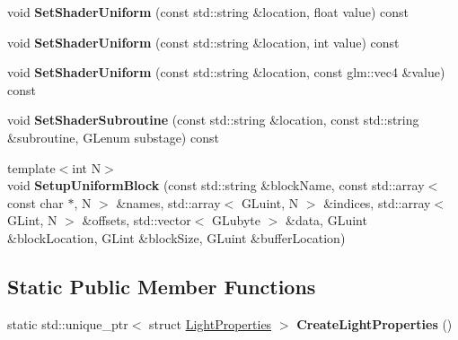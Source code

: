 \begin{DoxyCompactItemize}
\item 
\hypertarget{class_shader_program_a3a4c9cd6967787bded962acd7ce6b3c6}{}void {\bfseries Set\+Shader\+Uniform} (const std\+::string \&location, float value) const \label{class_shader_program_a3a4c9cd6967787bded962acd7ce6b3c6}

\item 
\hypertarget{class_shader_program_a93e7090cc8ff284bfcde6ae972aa5b9e}{}void {\bfseries Set\+Shader\+Uniform} (const std\+::string \&location, int value) const \label{class_shader_program_a93e7090cc8ff284bfcde6ae972aa5b9e}

\item 
\hypertarget{class_shader_program_a08b8936758c067aad38e6cd94608663f}{}void {\bfseries Set\+Shader\+Uniform} (const std\+::string \&location, const glm\+::vec4 \&value) const \label{class_shader_program_a08b8936758c067aad38e6cd94608663f}

\item 
\hypertarget{class_shader_program_ae2e00fa2f9107b34c758996021574b15}{}void {\bfseries Set\+Shader\+Subroutine} (const std\+::string \&location, const std\+::string \&subroutine, G\+Lenum substage) const \label{class_shader_program_ae2e00fa2f9107b34c758996021574b15}

\item 
\hypertarget{class_shader_program_a16169356d5ce43e64e6018ad5d79f594}{}{\footnotesize template$<$int N$>$ }\\void {\bfseries Setup\+Uniform\+Block} (const std\+::string \&block\+Name, const std\+::array$<$ const char $\ast$, N $>$ \&names, std\+::array$<$ G\+Luint, N $>$ \&indices, std\+::array$<$ G\+Lint, N $>$ \&offsets, std\+::vector$<$ G\+Lubyte $>$ \&data, G\+Luint \&block\+Location, G\+Lint \&block\+Size, G\+Luint \&buffer\+Location)\label{class_shader_program_a16169356d5ce43e64e6018ad5d79f594}

\end{DoxyCompactItemize}
\subsection*{Static Public Member Functions}
\begin{DoxyCompactItemize}
\item 
\hypertarget{class_shader_program_a9c09a5050b37c958e07ce4d9756421b9}{}static std\+::unique\+\_\+ptr$<$ struct \hyperlink{struct_light_properties}{Light\+Properties} $>$ {\bfseries Create\+Light\+Properties} ()\label{class_shader_program_a9c09a5050b37c958e07ce4d9756421b9}

\end{DoxyCompactItemize}
